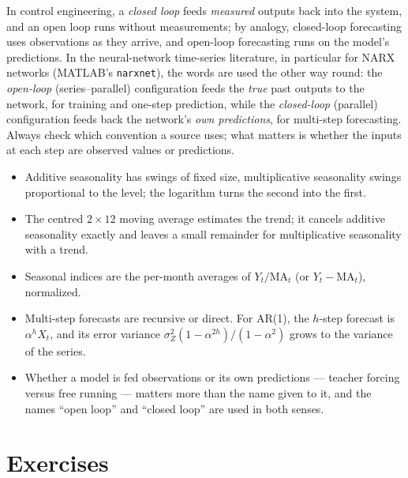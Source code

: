 \begin{notechapter}
\begin{pitfall}
In control engineering, a \emph{closed loop} feeds \emph{measured} outputs back into the
system, and an open loop runs without measurements; by analogy, closed-loop
forecasting uses observations as they arrive, and open-loop forecasting runs on the
model's predictions. In the neural-network time-series literature, in particular for
NARX networks (MATLAB's \texttt{narxnet}), the words are used the other way round: the
\emph{open-loop} (series--parallel) configuration feeds the \emph{true} past outputs to the
network, for training and one-step prediction, while the \emph{closed-loop} (parallel)
configuration feeds back the network's \emph{own predictions}, for multi-step
forecasting. Always check which convention a source uses; what matters is whether the
inputs at each step are observed values or predictions.
\end{pitfall}

\begin{chaptersummary}
\begin{itemize}[nosep]
  \item Additive seasonality has swings of fixed size, multiplicative seasonality swings
        proportional to the level; the logarithm turns the second into the first.
  \item The centred $2\times12$ moving average estimates the trend; it cancels additive seasonality
        exactly and leaves a small remainder for multiplicative seasonality with a trend.
  \item Seasonal indices are the per-month averages of $Y_t/\mathrm{MA}_t$ (or $Y_t - \mathrm{MA}_t$), normalized.
  \item Multi-step forecasts are recursive or direct. For AR(1), the $h$-step forecast is $\alpha^hX_t$, and its
        error variance $\sigma_Z^2(1 - \alpha^{2h})/(1 - \alpha^2)$ grows to the variance of the series.
  \item Whether a model is fed observations or its own predictions --- teacher forcing versus
        free running --- matters more than the name given to it, and the names
        ``open loop'' and ``closed loop'' are used in both senses.
\end{itemize}
\end{chaptersummary}

\section*{Exercises}


\end{notechapter}
